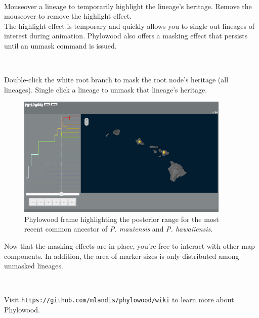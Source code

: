 \documentclass[11pt]{article}
\newcommand{\impmark}{\strut\vadjust{\domark}}
\newcommand{\domark}{%
  \vbox to 0pt{
    \kern-\dp\strutbox
    \smash{\llap{$\rightarrow$\kern1em}}
    \vss
  }%
}
\begin{document}
\noindent \\ \impmark Mouseover a lineage to temporarily highlight the lineage's heritage. Remove the mouseover to remove the highlight effect. \\

The highlight effect is temporary and quickly allows you to single out lineages of interest during animation.
Phylowood also offers a masking effect that persists until an unmask command is issued.

\noindent \\ \impmark Double-click the white root branch to mask the root node's heritage (all lineages). Single click a lineage to unmask that lineage's heritage. \\

\begin{figure}[H]
\centering
\includegraphics[width=4in]{figures/phw_br23}
\caption{Phylowood frame highlighting the posterior range for the most recent common ancestor of {\it P. mauiensis} and {\it P. hawaiiensis}.}
\end{figure}

Now that the masking effects are in place, you're free to interact with other map components.
In addition, the area of marker sizes is only distributed among unmasked lineages.

\noindent \\ \impmark Visit \texttt{https://github.com/mlandis/phylowood/wiki} to learn more about Phylowood.


\end{document}
